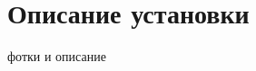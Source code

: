 \documentclass[../AISTR.tex]{subfiles}
\begin{document}
\section{Описание установки}
фотки и описание
\end{document}
